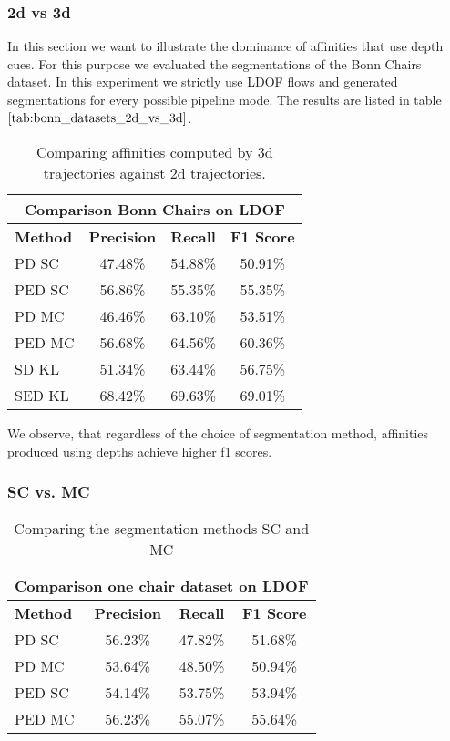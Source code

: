 \subsubsection{2d vs 3d}
In this section we want to illustrate the dominance of affinities that use depth cues. For this purpose we evaluated the segmentations of the Bonn Chairs dataset. In this experiment we strictly use LDOF flows and generated segmentations for every possible pipeline mode. The results are listed in table $\ref{tab:bonn_datasets_2d_vs_3d}$.
\begin{table}[H]
\centering
\begin{tabular}{|l|c|c|c|}
\hline
\multicolumn{4}{|c|}{Comparison Bonn Chairs on LDOF}                        \\ \hline
\textbf{Method} & \textbf{Precision} & \textbf{Recall} & \textbf{F1 Score}  \\ \hline
PD SC & 47.48\% & 54.88\% & 50.91\% \\ \hline
PED SC & 56.86\% & 55.35\% & 55.35\% \\ \hline
PD MC & 46.46\% & 63.10\% & 53.51\% \\ \hline
PED MC & 56.68\% & 64.56\% & 60.36\% \\ \hline              
SD KL & 51.34\% & 63.44\% & 56.75\% \\ \hline
SED KL & 68.42\% & 69.63\% & 69.01\% \\ \hline
\end{tabular}
\caption[2D vs. 3D: Bonn Datasets]{Comparing affinities computed by 3d trajectories against 2d trajectories.}
\label{tab:bonn_datasets_2d_vs_3d}
\end{table}
We observe, that regardless of the choice of segmentation method, affinities produced using depths achieve higher f1 scores.

\subsubsection{SC vs. MC}
\begin{table}[H]
\centering
\begin{tabular}{|l|c|c|c|}
\hline
\multicolumn{4}{|c|}{Comparison one chair dataset on LDOF}                        \\ \hline
\textbf{Method} & \textbf{Precision} & \textbf{Recall} & \textbf{F1 Score}  \\ \hline
PD SC & 56.23\% & 47.82\% & 51.68\% \\ \hline
PD MC & 53.64\% & 48.50\% & 50.94\% \\ \hline
PED SC & 54.14\% & 53.75\% & 53.94\% \\ \hline
PED MC & 56.23\% & 55.07\% & 55.64\% \\ \hline              
\end{tabular}
\caption[SC vs. MC]{Comparing the segmentation methods SC and MC} 
\label{tab:one_chair_sc_vs_mc}
\end{table}


